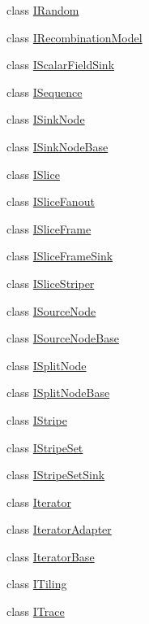 \begin{DoxyCompactItemize}
class \hyperlink{class_wire_cell_1_1_i_random}{I\+Random}
\item 
class \hyperlink{class_wire_cell_1_1_i_recombination_model}{I\+Recombination\+Model}
\item 
class \hyperlink{class_wire_cell_1_1_i_scalar_field_sink}{I\+Scalar\+Field\+Sink}
\item 
class \hyperlink{class_wire_cell_1_1_i_sequence}{I\+Sequence}
\item 
class \hyperlink{class_wire_cell_1_1_i_sink_node}{I\+Sink\+Node}
\item 
class \hyperlink{class_wire_cell_1_1_i_sink_node_base}{I\+Sink\+Node\+Base}
\item 
class \hyperlink{class_wire_cell_1_1_i_slice}{I\+Slice}
\item 
class \hyperlink{class_wire_cell_1_1_i_slice_fanout}{I\+Slice\+Fanout}
\item 
class \hyperlink{class_wire_cell_1_1_i_slice_frame}{I\+Slice\+Frame}
\item 
class \hyperlink{class_wire_cell_1_1_i_slice_frame_sink}{I\+Slice\+Frame\+Sink}
\item 
class \hyperlink{class_wire_cell_1_1_i_slice_striper}{I\+Slice\+Striper}
\item 
class \hyperlink{class_wire_cell_1_1_i_source_node}{I\+Source\+Node}
\item 
class \hyperlink{class_wire_cell_1_1_i_source_node_base}{I\+Source\+Node\+Base}
\item 
class \hyperlink{class_wire_cell_1_1_i_split_node}{I\+Split\+Node}
\item 
class \hyperlink{class_wire_cell_1_1_i_split_node_base}{I\+Split\+Node\+Base}
\item 
class \hyperlink{class_wire_cell_1_1_i_stripe}{I\+Stripe}
\item 
class \hyperlink{class_wire_cell_1_1_i_stripe_set}{I\+Stripe\+Set}
\item 
class \hyperlink{class_wire_cell_1_1_i_stripe_set_sink}{I\+Stripe\+Set\+Sink}
\item 
class \hyperlink{class_wire_cell_1_1_iterator}{Iterator}
\item 
class \hyperlink{class_wire_cell_1_1_iterator_adapter}{Iterator\+Adapter}
\item 
class \hyperlink{class_wire_cell_1_1_iterator_base}{Iterator\+Base}
\item 
class \hyperlink{class_wire_cell_1_1_i_tiling}{I\+Tiling}
\item 
class \hyperlink{class_wire_cell_1_1_i_trace}{I\+Trace}

\end{DoxyCompactItemize}
